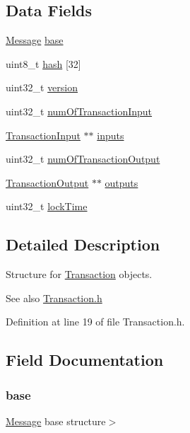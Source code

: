 \subsection*{Data Fields}
\begin{DoxyCompactItemize}
\item 
\hyperlink{struct_m_i_message}{Message} \hyperlink{struct_m_i_transaction_a487e4843cf1cf7397eb2e1bcf91cbf3b}{base}
\item 
uint8\_\-t \hyperlink{struct_m_i_transaction_a7ff9da008bf055da1f1ba994c562057d}{hash} \mbox{[}32\mbox{]}
\item 
uint32\_\-t \hyperlink{struct_m_i_transaction_acd99bb05ca015e7d74448acb1deba7ca}{version}
\item 
uint32\_\-t \hyperlink{struct_m_i_transaction_a84a553b85f92fbe799c9e927aeae4491}{numOfTransactionInput}
\item 
\hyperlink{struct_m_i_transaction_input}{TransactionInput} $\ast$$\ast$ \hyperlink{struct_m_i_transaction_ad10010cd6a4f129706cf61bd0dce100f}{inputs}
\item 
uint32\_\-t \hyperlink{struct_m_i_transaction_aa6fd5ebfb79f09bf74e1b0f63f557348}{numOfTransactionOutput}
\item 
\hyperlink{struct_m_i_transaction_output}{TransactionOutput} $\ast$$\ast$ \hyperlink{struct_m_i_transaction_af782b989431a6d6831659788e15004f9}{outputs}
\item 
uint32\_\-t \hyperlink{struct_m_i_transaction_aea4d95211b00c311b2d84c6177429162}{lockTime}
\end{DoxyCompactItemize}


\subsection{Detailed Description}
Structure for \hyperlink{struct_m_i_transaction}{Transaction} objects. 

\begin{DoxySeeAlso}{See also}
\hyperlink{_m_i_transaction_8h}{Transaction.h} 
\end{DoxySeeAlso}


Definition at line 19 of file Transaction.h.



\subsection{Field Documentation}
\hypertarget{struct_m_i_transaction_a487e4843cf1cf7397eb2e1bcf91cbf3b}{
\subsubsection[{base}]{ {\bf base}}}
\label{struct_m_i_transaction_a487e4843cf1cf7397eb2e1bcf91cbf3b}
\hyperlink{struct_m_i_message}{Message} base structure$>$ 

